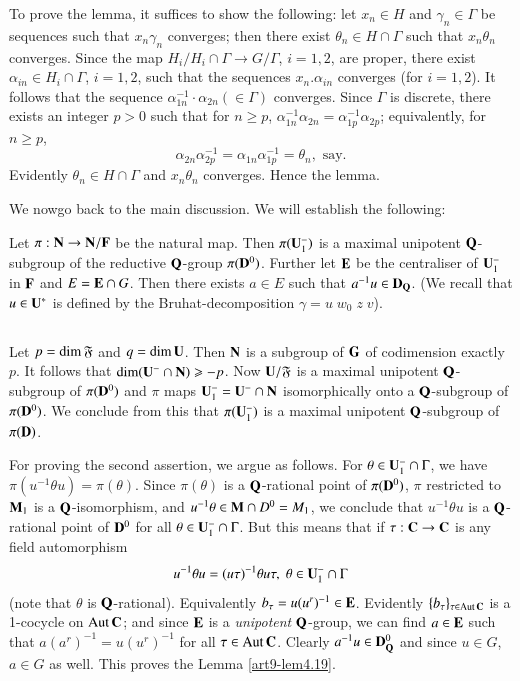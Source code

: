 To prove the lemma, it suffices to show the following: let $x_n \in H$ and $\gamma_n \in \Gamma$ be sequences such that $x_n \gamma_n$ converges; then there exist $\theta_n \in H \cap \Gamma$ such that $x_n \theta_n$ converges. Since the map $H_i/ H_i \cap \Gamma \to G/ \Gamma$, $i = 1, 2$, are proper, there exist $\alpha_{in} \in H_i \cap \Gamma$, $i = 1,2$, such that the sequences $x_n. \alpha_{in}$ converges (for $i = 1, 2$). It follows that the sequence $\alpha^{-1}_{1n} \cdot\alpha_{2n} (\in \Gamma)$ converges. Since $\Gamma$ is discrete, there exists an integer $p>0$ such that for $n \geqslant p$, $\alpha^{-1}_{1n} \alpha_{2n} = \alpha^{-1}_{1p} \alpha_{2p}$; equivalently, for $n \geqslant p$,
$$
\alpha_{2n} \alpha^{-1}_{2p} = \alpha_{1n} \alpha^{-1}_{1p} = \theta_n ,\text{ say}.
$$
Evidently $\theta_n \in H \cap \Gamma $ and $x_n \theta_n$ converges. Hence the lemma.

We now\pageoriginale go back to the main discussion. We will establish the following:

\begin{lemma}\label{art9-lem4.19}
Let $\pi : \mathbf{N} \to \mathbf{N} / \mathbf{F}$ be the natural map. Then $\pi(\mathbf{U}^-_1)$ is a maximal unipotent $\mathbf{Q}$-subgroup of the reductive $\mathbf{Q}$-group $\pi (\mathbf{D}^0)$. Further let $\mathbf{E}$ be the centraliser of $\mathbf{U}^-_1$ in $\mathbf{F}$ and $E = \mathbf{E} \cap G$. Then there exists $a \in E$ such that $a^{-1} u \in \mathbf{D}_{\mathbf{Q}}$. (We recall that $u \in \mathbf{U}^\ast$ is defined by the Bruhat-decomposition $\gamma = u \;w_0\; z \;v$).
\end{lemma}

\subsection{}\label{art9-subsec4.20}
Let $p = \dim \mathfrak{F}$ and $q = \dim \mathbf{U}$. Then $\mathbf{N}$ is a subgroup of $\mathbf{G}$ of codimension exactly $p$. It follows that $\dim (\mathbf{U}^- \cap \mathbf{N}) \geqslant - p$. Now $\mathbf{U}/\mathfrak{F}$ is a maximal unipotent $\mathbf{Q}$-subgroup of $\pi (\mathbf{D}^0)$ and $\pi$ maps $\mathbf{U}^-_1 = \mathbf{U}^- \cap \mathbf{N}$ isomorphically  onto a $\mathbf{Q}$-subgroup of $\pi (\mathbf{D}^0)$. We conclude from this that $\pi (\mathbf{U}^-_1)$ is a maximal unipotent $\mathbf{Q}$-subgroup of $\pi(\mathbf{D})$.

For proving the second assertion, we argue as follows. For $\theta \in \mathbf{U}^-_1 \cap \Gamma$, we have $\pi (u^{-1} \theta u) = \pi (\theta)$. Since $\pi (\theta)$ is a $\mathbf{Q}$-rational point of $\pi (\mathbf{D}^0)$, $\pi$ restricted to $\mathbf{M}_1$ is a $\mathbf{Q}$-isomorphism, and $u^{-1} \theta \in \mathbf{M} \cap D^0 = M_1$, we conclude that $u^{-1} \theta u$ is a $\mathbf{Q}$-rational point of $\mathbf{D}^0$ for all $\theta \in \mathbf{U}^-_1 \cap \Gamma$. But this means that if $\tau : \mathbf{C} \to \mathbf{C}$ is any field automorphism
$$
u^{-1} \theta u = (u \tau)^{-1} \theta u \tau, \; \theta \in \mathbf{U}^{-}_1 \cap \Gamma
$$
(note that $\theta$ is $\mathbf{Q}$-rational). Equivalently $b_\tau = u (u^r)^{-1} \in \mathbf{E}$. Evidently $\{b_\tau\}_{\tau \in \operatorname{Aut} \mathbf{C}}$ is a 1-cocycle on $\operatorname{Aut} \mathbf{C}$; and since $\mathbf{E}$ is a \textit{unipotent} $\mathbf{Q}$-group, we can find $a\in \mathbf{E}$ such that $a (a^r)^{-1} = u (u^r)^{-1}$ for all $\tau \in \operatorname{Aut} \mathbf{C}$. Clearly $a^{-1} u \in \mathbf{D}^0_{\mathbf{Q}}$ and since $u \in G$, $a \in G$ as well. This proves the Lemma \ref{art9-lem4.19}.

